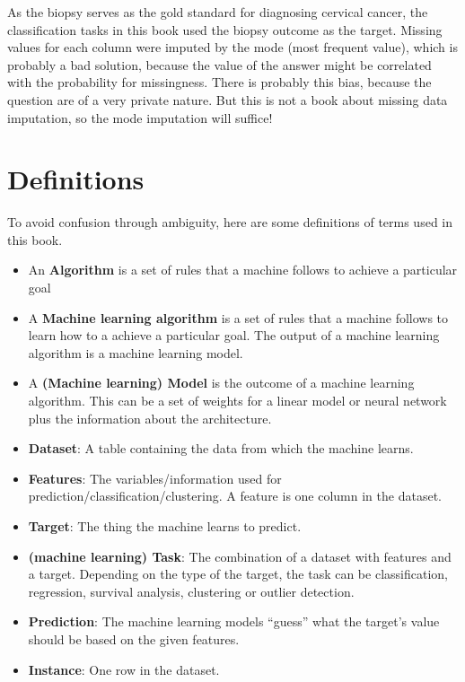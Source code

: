 \documentclass[12pt,]{krantz}
\providecommand{\tightlist}{%
  \setlength{\itemsep}{0pt}\setlength{\parskip}{0pt}}
\theoremstyle{definition}
\theoremstyle{definition}
\theoremstyle{definition}
\theoremstyle{remark}
\begin{document}
As the biopsy serves as the gold standard for diagnosing cervical
cancer, the classification tasks in this book used the biopsy outcome as
the target. Missing values for each column were imputed by the mode
(most frequent value), which is probably a bad solution, because the
value of the answer might be correlated with the probability for
missingness. There is probably this bias, because the question are of a
very private nature. But this is not a book about missing data
imputation, so the mode imputation will suffice!

\hypertarget{htmlwidget-0b23377a32b802608300}{}

\citep{fernandes2017transfer}

\chapter{Definitions}\label{definitions}

To avoid confusion through ambiguity, here are some definitions of terms
used in this book.

\begin{itemize}
\tightlist
\item
  An \textbf{Algorithm} is a set of rules that a machine follows to
  achieve a particular goal \citep{algorithm}
\item
  A \textbf{Machine learning algorithm} is a set of rules that a machine
  follows to learn how to a achieve a particular goal. The output of a
  machine learning algorithm is a machine learning model.
\item
  A \textbf{(Machine learning) Model} is the outcome of a machine
  learning algorithm. This can be a set of weights for a linear model or
  neural network plus the information about the architecture.
\item
  \textbf{Dataset}: A table containing the data from which the machine
  learns.
\item
  \textbf{Features}: The variables/information used for
  prediction/classification/clustering. A feature is one column in the
  dataset.
\item
  \textbf{Target}: The thing the machine learns to predict.
\item
  \textbf{(machine learning) Task}: The combination of a dataset with
  features and a target. Depending on the type of the target, the task
  can be classification, regression, survival analysis, clustering or
  outlier detection.
\item
  \textbf{Prediction}: The machine learning models ``guess'' what the
  target's value should be based on the given features.
\item
  \textbf{Instance}: One row in the dataset.
\end{itemize}
\end{document}
